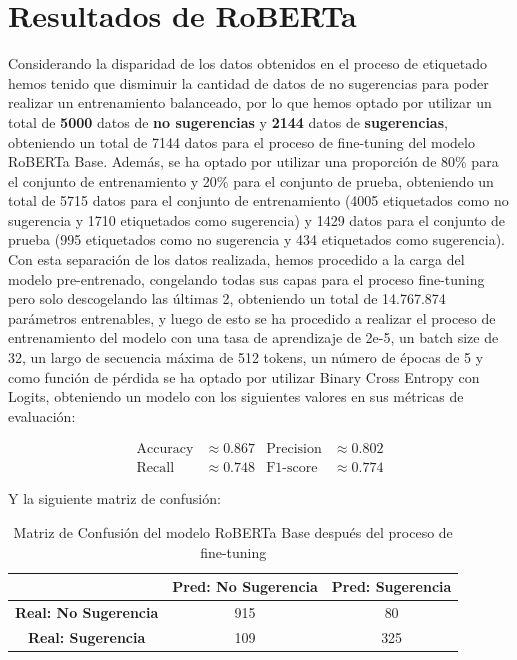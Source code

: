 \section{Resultados de RoBERTa}
Considerando la disparidad de los datos obtenidos en el proceso de etiquetado hemos tenido que disminuir la cantidad de datos de no sugerencias para poder realizar un entrenamiento balanceado, por lo que hemos optado por utilizar un total de \textbf{5000} datos de \textbf{no sugerencias} y \textbf{2144} datos de \textbf{sugerencias}, obteniendo un total de 7144 datos para el proceso de fine-tuning del modelo RoBERTa Base. Además, se ha optado por utilizar una proporción de 80\% para el conjunto de entrenamiento y 20\% para el conjunto de prueba, obteniendo un total de 5715 datos para el conjunto de entrenamiento (4005 etiquetados como no sugerencia y 1710 etiquetados como sugerencia) y 1429 datos para el conjunto de prueba (995 etiquetados como no sugerencia y 434 etiquetados como sugerencia). Con esta separación de los datos realizada, hemos procedido a la carga del modelo pre-entrenado, congelando todas sus capas para el proceso fine-tuning pero solo descogelando las últimas 2, obteniendo un total de 14.767.874 parámetros entrenables, y luego de esto se ha procedido a realizar el proceso de entrenamiento del modelo con una tasa de aprendizaje de 2e-5, un batch size de 32, un largo de secuencia máxima de 512 tokens, un número de épocas de 5 y como función de pérdida se ha optado por utilizar Binary Cross Entropy con Logits, obteniendo un modelo con los siguientes valores en sus métricas de evaluación:


\begin{align*}
\text{Accuracy} &\approx 0.867 & \text{Precision} &\approx 0.802 \\
\text{Recall}   &\approx 0.748 & \text{F1-score}  &\approx 0.774
\end{align*}


Y la siguiente matriz de confusión:

\begin{table}[H]
\centering
\begin{tabular}{|c|c|c|}
\hline
\textbf{} & \textbf{Pred: No Sugerencia} & \textbf{Pred: Sugerencia} \\ \hline
\textbf{Real: No Sugerencia} & 915 & 80 \\ \hline
\textbf{Real: Sugerencia} & 109 & 325 \\ \hline
\end{tabular}
\caption{Matriz de Confusión del modelo RoBERTa Base después del proceso de fine-tuning}
\label{tab:matriz_confusion_roberta}
\end{table}


